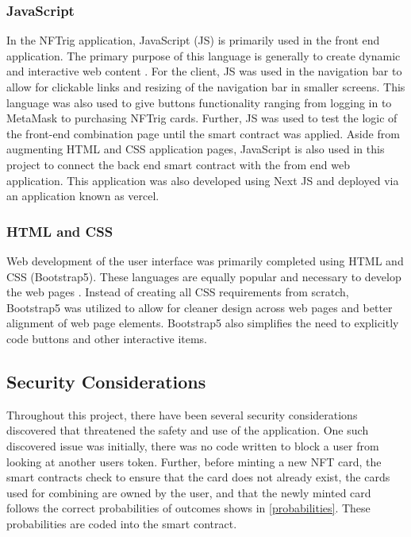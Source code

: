 \documentclass[acmsmall,nonacm]{acmart}
\begin{document}
\subsubsection{JavaScript}
In the NFTrig application, JavaScript (JS) is primarily used in the front end application. The primary purpose of this language is generally to create dynamic and interactive web content \cite{haverbeke2018eloquent}. For the client, JS was used in the navigation bar to allow for clickable links and resizing of the navigation bar in smaller screens. This language was also used to give buttons functionality ranging from logging in to MetaMask to purchasing NFTrig cards. Further, JS was used to test the logic of the front-end combination page until the smart contract was applied. Aside from augmenting HTML and CSS application pages, JavaScript is also used in this project to connect the back end smart contract with the from end web application. This application was also developed using Next JS and deployed via an application known as vercel.

\subsubsection{HTML and CSS}
Web development of the user interface was primarily completed using HTML and CSS (Bootstrap5). These languages are equally popular and necessary to develop the web pages \cite{ghulam2021konseptual}. Instead of creating all CSS requirements from scratch, Bootstrap5 was utilized to allow for cleaner design across web pages and better alignment of web page elements. Bootstrap5 also simplifies the need to explicitly code buttons and other interactive items. 

\subsection{Security Considerations}
Throughout this project, there have been several security considerations discovered that threatened the safety and use of the application. One such discovered issue was initially, there was no code written to block a user from looking at another users token. Further, before minting a new NFT card, the smart contracts check to ensure that the card does not already exist, the cards used for combining are owned by the user, and that the newly minted card follows the correct probabilities of outcomes shows in \ref{probabilities}. These probabilities are coded into the smart contract.  
\end{document}
